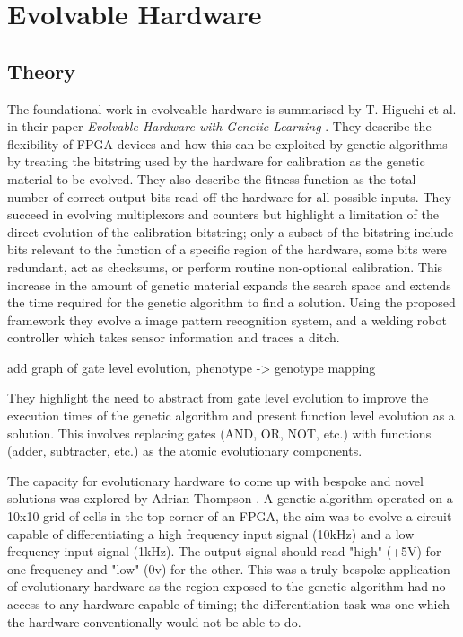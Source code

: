 \section{Evolvable Hardware}

\subsection{Theory}
The foundational work in evolveable hardware is summarised by T. Higuchi et al. in their
paper {\em Evolvable Hardware with Genetic Learning} \cite{541893}. They describe
the flexibility of FPGA devices and how this can be exploited by genetic algorithms
by treating the bitstring used by the hardware for calibration as the genetic material
to be evolved. They also describe the fitness function as the total number of correct
output bits read off the hardware for all possible inputs. They succeed in evolving multiplexors and
counters but highlight a limitation of the direct evolution of the calibration
bitstring; only a subset of the bitstring include bits relevant to the function
of a specific region of the hardware, some bits were redundant, act as checksums, or
perform routine non-optional calibration. This increase in the amount of genetic
material expands the search space and extends the time required for the genetic algorithm to find a solution.
Using the proposed framework they evolve a image pattern recognition system,
and a welding robot controller which takes sensor information and traces a ditch.

\todo add graph of gate level evolution, phenotype -> genotype mapping

They highlight the need to abstract from gate level evolution to improve the
execution times of the genetic algorithm and present function level evolution
as a solution. This involves replacing gates (AND, OR, NOT, etc.) with functions
(adder, subtracter, etc.) as the atomic evolutionary components.

The capacity for evolutionary hardware to come up with bespoke and novel solutions
was explored by Adrian Thompson \cite{10.1007/3-540-63173-9_61}. A genetic algorithm
operated on a 10x10 grid of cells in the top corner of an FPGA, the aim was to evolve
a circuit capable of differentiating a high frequency input signal (10kHz) and a
low frequency input signal (1kHz). The output signal should read "high" (+5V) for one frequency
and "low" (0v) for the other. This was a truly bespoke application of evolutionary
hardware as the region exposed to the genetic algorithm had no access to any
hardware capable of timing; the differentiation task was one which the hardware
conventionally would not be able to do.

